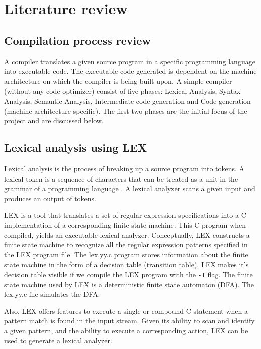 \chapter{Literature review}
\section{Compilation process review}
A compiler translates a given source program in a specific programming language into executable code\cite{citation-2-name-here}. The executable code generated is dependent on the machine architecture on which the compiler is being built upon. A simple compiler (without any code optimizer) consist of five phases: Lexical Analysis, Syntax Analysis, Semantic Analysis, Intermediate code generation and Code generation (machine architecture specific)\cite{citation-1-name-here}. The first two phases are the initial focus of the project and are discussed below. 
\section{Lexical analysis using LEX}
Lexical analysis is the process of breaking up a source program into tokens. A lexical token is a sequence of characters that can be treated as a unit in the grammar of a programming language \cite{citation-1-name-here}. A lexical analyzer scans a given input and produces an output of tokens.

LEX is a tool that translates a set of regular expression specifications into a C implementation of a corresponding finite state machine\cite{citation-1-name-here}. This C program when compiled, yields an executable lexical analyzer. Conceptually, LEX constructs a finite state machine to recognize all the regular expression patterns specified in the LEX program file. The lex.yy.c program stores information about the finite state machine in the form of a decision table (transition table). LEX makes it's decision table visible if we compile the LEX program with the \texttt{-T} flag. The finite state machine used by LEX is a deterministic finite state automaton (DFA). The lex.yy.c file simulates the DFA.

Also, LEX offers features to execute a single or compound C statement when a pattern match is found in the input stream. Given its ability to scan and identify a given pattern, and the ability to execute a corresponding action, LEX can be used to generate a lexical analyzer.
 
